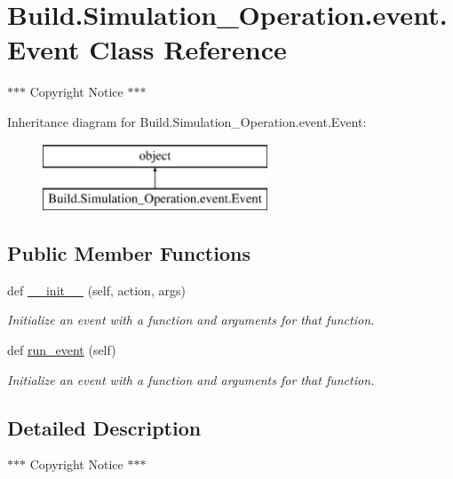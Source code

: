 \hypertarget{class_build_1_1_simulation___operation_1_1event_1_1_event}{}\section{Build.\+Simulation\+\_\+\+Operation.\+event.\+Event Class Reference}
\label{class_build_1_1_simulation___operation_1_1event_1_1_event}


$\ast$$\ast$$\ast$ Copyright Notice $\ast$$\ast$$\ast$  


Inheritance diagram for Build.\+Simulation\+\_\+\+Operation.\+event.\+Event\+:\begin{figure}[H]
\begin{center}
\leavevmode
\includegraphics[height=2.000000cm]{class_build_1_1_simulation___operation_1_1event_1_1_event}
\end{center}
\end{figure}
\subsection*{Public Member Functions}
\begin{DoxyCompactItemize}
\item 
def \hyperlink{class_build_1_1_simulation___operation_1_1event_1_1_event_a9453491fff56e3d46eff942d308d4c87}{\+\_\+\+\_\+init\+\_\+\+\_\+} (self, action, args)
\begin{DoxyCompactList}\small\item\em Initialize an event with a function and arguments for that function. \end{DoxyCompactList}\item 
def \hyperlink{class_build_1_1_simulation___operation_1_1event_1_1_event_a0714e3275d4c67cd5e1757e846fc3dbf}{run\+\_\+event} (self)
\begin{DoxyCompactList}\small\item\em Initialize an event with a function and arguments for that function. \end{DoxyCompactList}\end{DoxyCompactItemize}


\subsection{Detailed Description}
$\ast$$\ast$$\ast$ Copyright Notice $\ast$$\ast$$\ast$ 

